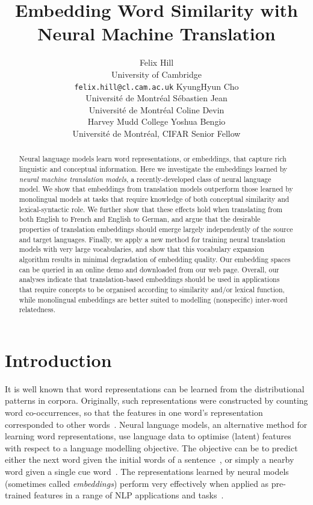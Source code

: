 \documentclass{article} %
\title{Embedding Word Similarity with \\ Neural Machine Translation}
\author{
Felix Hill \\
University of Cambridge \\
\texttt{felix.hill@cl.cam.ac.uk} 
\And
KyungHyun Cho \\
Universit\'{e} de Montr\'{e}al
\And
Sébastien Jean \\
Universit\'{e} de Montr\'{e}al
\And
Coline Devin \\
Harvey Mudd College
\And
Yoshua Bengio \\
Universit\'{e} de Montr\'{e}al, CIFAR Senior Fellow
}
\begin{document}
\maketitle

\begin{abstract}
Neural language models learn word representations, or embeddings, that capture rich linguistic and conceptual information. Here we investigate the embeddings learned by \emph{neural machine translation models}, a recently-developed class of neural language model. We show that embeddings from translation models outperform those learned by monolingual models at tasks that require knowledge of both conceptual similarity and lexical-syntactic role. We further show that these effects hold when translating from both English to French and English to German, and argue that the desirable properties of translation embeddings should emerge largely independently of the source and target languages. Finally, we apply a new method for training neural translation models with very large vocabularies, and show that this vocabulary expansion algorithm results in minimal degradation of embedding quality. Our embedding spaces can be queried in an online demo and downloaded from our web page. Overall, our analyses indicate that translation-based embeddings should be used in applications that require concepts to be organised according to similarity and/or lexical function, while monolingual embeddings are better suited to modelling (nonspecific) inter-word relatedness.
\end{abstract}

\section{Introduction}

It is well known that word representations can be learned from the distributional patterns in corpora. Originally, such representations were constructed by counting word co-occurrences, so that the features in one word's representation corresponded to other words~\citep{landauer1997solution,turney2010frequency}. Neural language models, an alternative method for learning word representations, use language data to optimise (latent) features with respect to a language modelling objective. The objective can be to predict either the next word given the initial words of a sentence~\citep{Bengio2003lm,mnih2009scalable,collobert2008unified}, or simply a nearby word given a single cue word~\citep{mikolov2013distributed,Pennington2014}. The representations learned by neural models (sometimes called \emph{embeddings}) perform very effectively when applied as pre-trained features in a range of NLP applications and tasks~\citep{baroni2014don}. 
\end{document}
